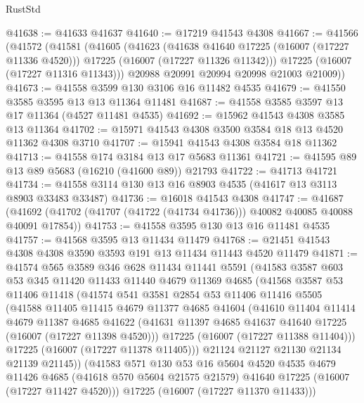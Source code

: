 \begin{lexlean}{RustStd}
\begin{coremodule}
@41638 := @41633 @41637
@41640 := @17219 @41543 @4308
@41667 := @41566
    (@41572
      (@41581
        (@41605
          (@41623
            (@41638 @41640 @17225 (@16007 (@17227 @11336 @4520)))
            @17225
            (@16007 (@17227 @11326 @11342)))
          @17225
          (@16007 (@17227 @11316 @11343)))
        @20988
        @20991
        @20994
        @20998
        @21003
        @21009))
@41673 := @41558 @3599 @130 @3106 @16 @11482 @4535
@41679 := @41550 @3585 @3595 @13 @13 @11364 @11481
@41687 := @41558 @3585 @3597 @13 @17 @11364 (@4527 @11481 @4535)
@41692 := @15962 @41543 @4308 @3585 @13 @11364
@41702 := @15971 @41543 @4308 @3500 @3584 @18 @13 @4520 @11362 @4308 @3710
@41707 := @15941 @41543 @4308 @3584 @18 @11362
@41713 := @41558 @174 @3184 @13 @17 @5683 @11361
@41721 := @41595 @89 @13 @89 @5683 (@16210 (@41600 @89)) @21793
@41722 := @41713 @41721
@41734 := @41558 @3114 @130 @13 @16 @8903 @4535 (@41617 @13 @3113 @8903 @33483 @33487)
@41736 := @16018 @41543 @4308
@41747 := @41687
    (@41692 (@41702 (@41707 (@41722 (@41734 @41736))) @40082 @40085 @40088 @40091 @17854))
@41753 := @41558 @3595 @130 @13 @16 @11481 @4535
@41757 := @41568 @3595 @13 @11434 @11479
@41768 := @21451 @41543 @4308 @4308 @3590 @3593 @191 @13 @11434 @11443 @4520 @11479
@41871 := @41574
    @565
    @3589
    @346
    @628
    @11434
    @11441
    @5591
    (@41583
      @3587
      @603
      @53
      @345
      @11420
      @11433
      @11440
      @4679
      @11369
      @4685
      (@41568
        @3587
        @53
        @11406
        @11418
        (@41574
          @541
          @3581
          @2854
          @53
          @11406
          @11416
          @5505
          (@41588
            @11405
            @11415
            @4679
            @11377
            @4685
            @41604
            (@41610
              @11404
              @11414
              @4679
              @11387
              @4685
              @41622
              (@41631 @11397 @4685 @41637 @41640 @17225 (@16007 (@17227 @11398 @4520)))
              @17225
              (@16007 (@17227 @11388 @11404)))
            @17225
            (@16007 (@17227 @11378 @11405)))
          @21124
          @21127
          @21130
          @21134
          @21139
          @21145))
      (@41583
        @571
        @130
        @53
        @16
        @5604
        @4520
        @4535
        @4679
        @11426
        @4685
        (@41618 @570 @5604 @21575 @21579)
        @41640
        @17225
        (@16007 (@17227 @11427 @4520)))
      @17225
      (@16007 (@17227 @11370 @11433)))

\end{coremodule}
\end{lexlean}
